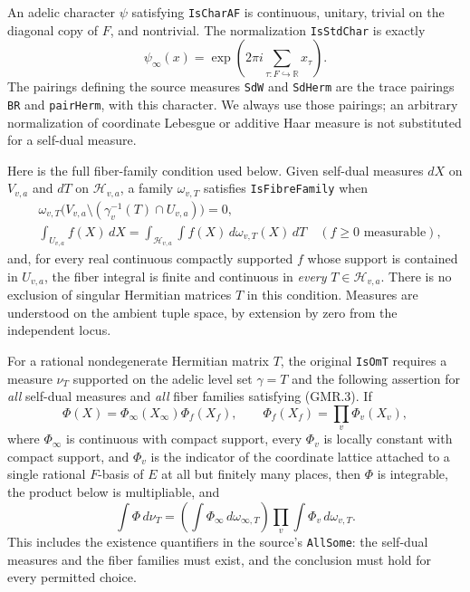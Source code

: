 An adelic character $\psi$ satisfying \texttt{IsCharAF} is continuous,
unitary, trivial on the diagonal copy of $F$, and nontrivial.  The
normalization \texttt{IsStdChar} is exactly
\[
 \psi_\infty(x)=\exp\left(2\pi i\sum_{\tau:F\hookrightarrow\mathbb R}x_\tau\right).
 \tag{GMR.2}
\]
The pairings defining the source measures \texttt{SdW} and
\texttt{SdHerm} are the trace pairings \texttt{BR} and
\texttt{pairHerm}, with this character.  We always use those pairings;
an arbitrary normalization of coordinate Lebesgue or additive Haar
measure is not substituted for a self-dual measure.

Here is the full fiber-family condition used below.  Given self-dual
measures $dX$ on $V_{v,a}$ and $dT$ on $\mathcal H_{v,a}$, a family
$\omega_{v,T}$ satisfies \texttt{IsFibreFamily} when
\[
\begin{split}
 &\omega_{v,T}\bigl(V_{v,a}\setminus(\gamma_v^{-1}(T)\cap U_{v,a})\bigr)=0,\\
 &\int_{U_{v,a}} f(X)\,dX
       =\int_{\mathcal H_{v,a}}\int f(X)\,d\omega_{v,T}(X)\,dT
       \quad(f\geq0\text{ measurable}),
\end{split}
 \tag{GMR.3}
\]
and, for every real continuous compactly supported $f$ whose support is
contained in $U_{v,a}$, the fiber integral is finite and continuous in
\emph{every} $T\in\mathcal H_{v,a}$.  There is no exclusion of singular
Hermitian matrices $T$ in this condition.  Measures are understood on
the ambient tuple space, by extension by zero from the independent
locus.

For a rational nondegenerate Hermitian matrix $T$, the original
\texttt{IsOmT} requires a measure $\nu_T$ supported on the adelic level
set $\gamma=T$ and the following assertion for \emph{all} self-dual
measures and \emph{all} fiber families satisfying (GMR.3).
If
\[
 \Phi(X)=\Phi_\infty(X_\infty)\Phi_f(X_f),\qquad
 \Phi_f(X_f)=\prod_v\Phi_v(X_v),
 \tag{GMR.4}
\]
where $\Phi_\infty$ is continuous with compact support, every $\Phi_v$
is locally constant with compact support, and $\Phi_v$ is the indicator
of the coordinate lattice attached to a single rational $F$-basis of
$E$ at all but finitely many places, then $\Phi$ is integrable,
the product below is multipliable, and
\[
 \int\Phi\,d\nu_T
   =\left(\int\Phi_\infty\,d\omega_{\infty,T}\right)
      \prod_v\int\Phi_v\,d\omega_{v,T}.
 \tag{GMR.5}
\]
This includes the existence quantifiers in the source's
\texttt{AllSome}: the self-dual measures and the fiber families must
exist, and the conclusion must hold for every permitted choice.

